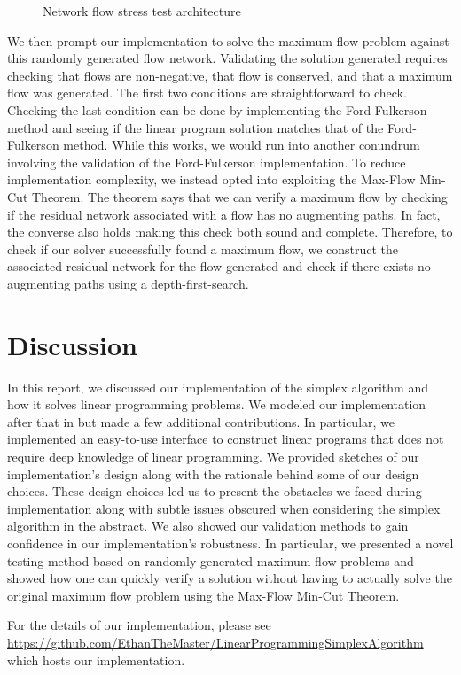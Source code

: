 \documentclass{article}
\begin{document}
\begin{figure}
    \centering
    
    \caption{Network flow stress test architecture}
    \label{fig:stress-test-architecture}
\end{figure}

We then prompt our implementation to solve the maximum flow problem against this randomly generated flow network. Validating the solution generated requires checking that flows are non-negative, that flow is conserved, and that a maximum flow was generated. The first two conditions are straightforward to check. Checking the last condition can be done by implementing the Ford-Fulkerson method and seeing if the linear program solution matches that of the Ford-Fulkerson method. While this works, we would run into another conundrum involving the validation of the Ford-Fulkerson implementation. To reduce implementation complexity, we instead opted into exploiting the Max-Flow Min-Cut Theorem. The theorem says that we can verify a maximum flow by checking if the residual network associated with a flow has no augmenting paths. In fact, the converse also holds making this check both sound and complete. Therefore, to check if our solver successfully found a maximum flow, we construct the associated residual network for the flow generated and check if there exists no augmenting paths using a depth-first-search. 

\section{Discussion}
In this report, we discussed our implementation of the simplex algorithm and how it solves linear programming problems. We modeled our implementation after that in \cite{CLRS} but made a few additional contributions. In particular, we implemented an easy-to-use interface to construct linear programs that does not require deep knowledge of linear programming. We provided sketches of our implementation's design along with the rationale behind some of our design choices. These design choices led us to present the obstacles we faced during implementation along with subtle issues obscured when considering the simplex algorithm in the abstract. We also showed our validation methods to gain confidence in our implementation's robustness. In particular, we presented a novel testing method based on randomly generated maximum flow problems and showed how one can quickly verify a solution without having to actually solve the original maximum flow problem using the Max-Flow Min-Cut Theorem. 

For the details of our implementation, please see \url{https://github.com/EthanTheMaster/LinearProgrammingSimplexAlgorithm} which hosts our implementation.


\end{document}
